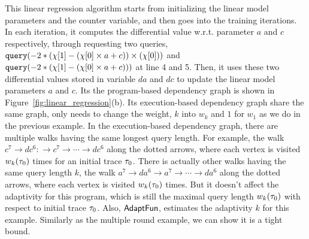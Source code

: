 This linear regression algorithm starts from initializing the linear model parameters and the counter variable,
and then goes into the training iterations.
In each iteration, it computes the differential value w.r.t. parameter
$a$ and $c$ respectively,
through requesting two queries, ${\tt query}(-2 * (\chi[1] - (\chi[0]\times a + c)) \times (\chi[0]))$ and 
${\tt query}(-2 * (\chi[1] - (\chi[0]\times a + c)))$
at line 4 and 5.
Then, it uses these two differential values stored in variable $da$ and $dc$ to update the linear model parameters $a$ and $c$.
%
Its the program-based dependency graph is shown in Figure~\ref{fig:linear_regression}(b). Its execution-based dependency graph share the same graph, only needs to change the weight, $k$ into $w_k$ and $1$ for $w_1$ as we do in the previous example.
In the execution-based dependency graph, there are multiple walks having the same longest query length.
For example, the walk $c^7 \to dc^6 : \to c^7 \to \cdots \to dc^6$ along the 
dotted arrows, where each vertex is visited $w_k(\mathtt{\tau}_0)$ times for an initial trace $\mathtt{\tau}_0$.
There is actually other walks having the same query length $k$, the 
walk $a^7 \to da^6  \to a^7 \to \cdots \to da^6 $ along the 
dotted arrows, where each vertex is visited $w_k(\mathtt{\tau}_0)$ times.
But it doesn't affect the adaptivity for this program, which is still the maximal query length $w_k(\mathtt{\tau}_0)$ with respect to initial trace $\mathtt{\tau}_0$.
Also, $\textsf{AdaptFun}$, estimates the adaptivity $k$ for this example. Similarly as the multiple round example, we can show it is a tight bound.
%
